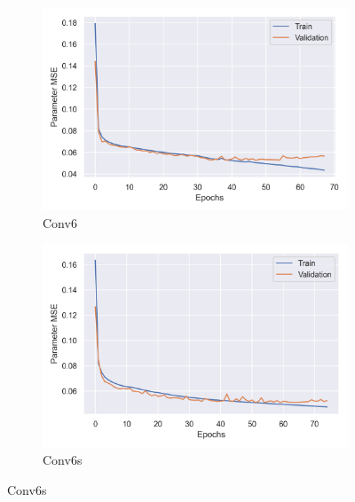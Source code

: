 \begin{figure}[t]\ContinuedFloat
    \begin{subfigure}[b]{0.45\textwidth}
        \centering
        \includegraphics[width=\textwidth]{figures/inverse-synth/loss-plots/conv6-mel.png}
        \caption{Conv6}
    \end{subfigure}
    \begin{subfigure}[b]{0.45\textwidth}
        \centering
        \includegraphics[width=\textwidth]{figures/inverse-synth/loss-plots/conv6s-mel.png}
        \caption{Conv6s}
    \end{subfigure}
    
    \vspace{1cm}
    

\end{figure}
